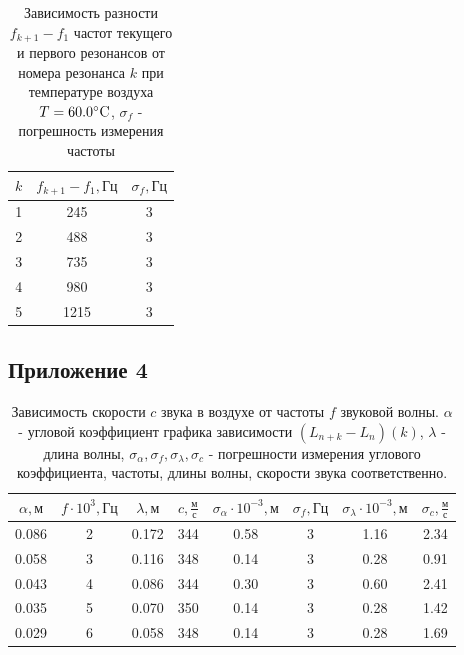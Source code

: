 \begin{table}[h]
    \centering
    \begin{tabular}{|c|c|c|}
    \hline
    $k$ & $f_{k+1} - f_1, \text{Гц}$ & $\sigma_f, \text{Гц}$  \\ \hline
    1   & 245                        & 3  \\ \hline
    2   & 488                        & 3  \\ \hline
    3   & 735                        & 3  \\ \hline
    4   & 980                        & 3  \\ \hline
    5   & 1215                       & 3  \\ \hline
\end{tabular}
    \caption{Зависимость разности $f_{k+1} - f_1$ частот текущего и первого резонансов от номера резонанса $k$ при температуре воздуха $T = 60.0\celsius$, $\sigma_f$ - погрешность измерения частоты}
    \label{tab:t9}
\end{table}
\newpage
\subsection{Приложение 4} \label{Приложение 4}

\begin{table}[h]
    \centering
    \begin{tabular}{|c|c|c|c|c|c|c|c|}
    \hline
    $\alpha, \text{м}$ & $f\cdot 10^{3}, \text{Гц}$ & $\lambda, \text{м}$ & $c, \frac{\text{м}}{\text{с}}$ & $\sigma_\alpha \cdot 10^{-3}, \text{м}$ & $\sigma_f, \text{Гц}$ & $\sigma_\lambda \cdot 10^{-3}, \text{м}$ & $\sigma_c, \frac{\text{м}}{\text{с}}$ \\ \hline
    0.086   & 2 & 0.172 & 344 & 0.58 & 3 & 1.16 & 2.34\\ \hline
    0.058   & 3 & 0.116 & 348 & 0.14 & 3 & 0.28 & 0.91\\ \hline
    0.043   & 4 & 0.086 & 344 & 0.30 & 3 & 0.60 & 2.41\\ \hline
    0.035   & 5 & 0.070 & 350 & 0.14 & 3 & 0.28 & 1.42\\ \hline
    0.029   & 6 & 0.058 & 348 & 0.14 & 3 & 0.28 & 1.69\\ \hline
\end{tabular}
    \caption{Зависимость скорости $c$ звука в воздухе от частоты $f$ звуковой волны. $\alpha$ - угловой коэффициент графика зависимости $(L_{n+k} - L_n)(k)$, $\lambda$ - длина волны, $\sigma_\alpha, \sigma_f, \sigma_\lambda, \sigma_c$ - погрешности измерения углового коэффициента, частоты, длины волны, скорости звука соответственно.}
    \label{tab:t10}
\end{table}

